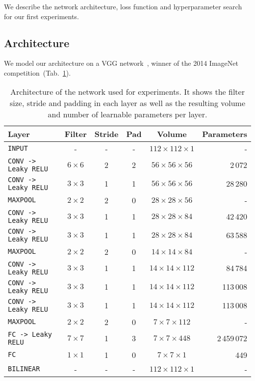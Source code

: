 We describe the network architecture, loss function and hyperparameter search for our first experiments.

\subsection{Architecture}
\label{subsec:Architecture1}
We model our architecture on a VGG network~\cite{Simonyan2014}, winner of the 2014 ImageNet competition~(Tab.~\ref{tab:convNetArchitecture}).
\begin{table}[h]
	\centering
	\begin{tabular}{lccccr}
	\hline
	\textbf{Layer} & \textbf{Filter} & \textbf{Stride} &\textbf{Pad} & \textbf{Volume} & \textbf{Parameters} \\
	\hline
	\texttt{INPUT}	& -	& - & - & $112 \times 112 \times 1$ & -\\
	\texttt{CONV -> Leaky RELU} & $6 \times 6$ & 2 & 2 & $56 \times 56 \times 56$ & 2\,072\\
	\texttt{CONV -> Leaky RELU} & $3 \times 3$ & 1 & 1 & $56 \times 56 \times 56$ & 28\,280\\
	\texttt{MAXPOOL} & $2 \times 2$ & 2 & 0 & $28 \times 28 \times 56$ & -\\
	\texttt{CONV -> Leaky RELU} & $3 \times 3$ & 1 & 1 & $28 \times 28 \times 84$ & 42\,420\\
	\texttt{CONV -> Leaky RELU} & $3 \times 3$ & 1 & 1 & $28 \times 28 \times 84$ & 63\,588\\
	\texttt{MAXPOOL} & $2 \times 2$ & 2 & 0 & $14 \times 14 \times 84$ & -\\
	\texttt{CONV -> Leaky RELU} & $3 \times 3$ & 1 & 1 & $14 \times 14 \times 112$ & 84\,784\\
	\texttt{CONV -> Leaky RELU} & $3 \times 3$ & 1 & 1 & $14 \times 14 \times 112$ & 113\,008\\
	\texttt{CONV -> Leaky RELU} & $3 \times 3$ & 1 & 1 & $14 \times 14 \times 112$ & 113\,008\\
	\texttt{MAXPOOL} & $2 \times 2$ & 2 & 0 & $7 \times 7 \times 112$ & -\\
	\texttt{FC -> Leaky RELU} & $7 \times 7$ & 1 & 3 & $7 \times 7 \times 448$ & 2\,459\,072\\
	\texttt{FC} & $1 \times 1$ & 1 & 0 & $7 \times 7 \times 1$ & 449 \\
	\texttt{BILINEAR} & - & - & - & $112 \times 112 \times 1$ & -\\
	\hline
	\end{tabular}
	\caption[Selected convolutional network architecture]{Architecture of the network used for experiments. It shows the filter size, stride and padding in each layer as well as the resulting volume and number of learnable parameters per layer.}
	\label{tab:convNetArchitecture}
\end{table}

